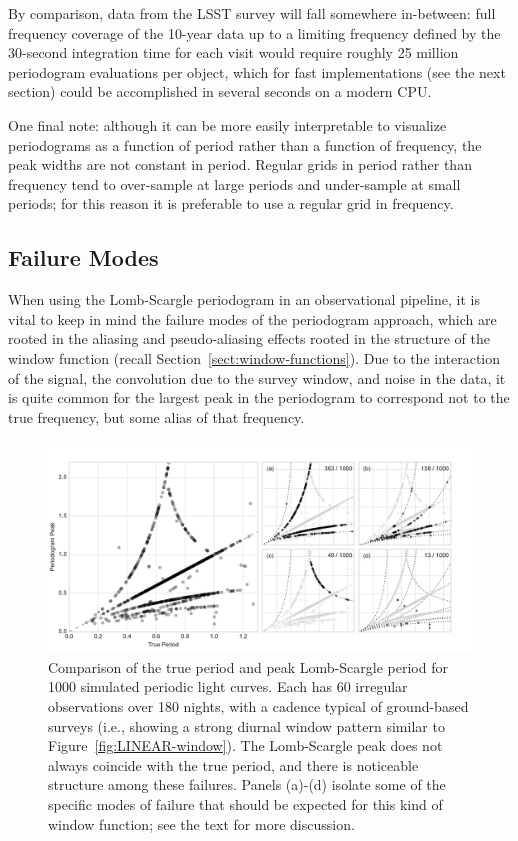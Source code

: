 \documentclass[preprint]{aastex}
\newcommand{\fig}[1]{Figure~\ref{fig:#1}}
\newcommand{\figlabel}[1]{\label{fig:#1}}
\newcommand{\Sect}[1]{Section~\ref{sect:#1}}
\newcommand{\sect}[1]{\Sect{#1}}
\newcommand{\sectlabel}[1]{\label{sect:#1}}
\begin{document}
By comparison, data from the LSST survey \citep{Ivezic08LSST}
will fall somewhere in-between: full frequency coverage of
the 10-year data up to a limiting frequency defined by the 30-second
integration time for each visit would require roughly 25 million
periodogram evaluations per object, which for fast implementations
(see the next section) could be accomplished in several seconds on
a modern CPU.

One final note: although it can be more easily interpretable to
visualize periodograms as a function of period rather than a function of
frequency, the peak widths are not constant in period.
Regular grids in period rather than frequency tend to over-sample
at large periods and under-sample at small periods;
for this reason it is preferable to use a regular grid in frequency.

\subsection{Failure Modes}
\sectlabel{failure-modes}

When using the Lomb-Scargle periodogram in an observational pipeline, it is
vital to keep in mind the failure modes of the periodogram approach, which
are rooted in the aliasing and pseudo-aliasing effects rooted in the structure
of the window function (recall \sect{window-functions}).
Due to the interaction of the signal, the convolution due to the survey window,
and noise in the data, it is quite common for the largest peak in the
periodogram to correspond not to the true frequency, but some alias of that
frequency.

\begin{figure}[ht]
  \centering
  \includegraphics[width=\textwidth]{fig25_failure_modes}
  \caption{Comparison of the true period and peak Lomb-Scargle period for
    1000 simulated periodic light curves.
    Each has 60 irregular observations over 180 nights,
    with a cadence typical of ground-based surveys (i.e., showing a strong
    diurnal window pattern similar to \fig{LINEAR-window}).
    The Lomb-Scargle peak does not always coincide with the true period,
    and there is noticeable structure among these failures.
    Panels (a)-(d) isolate some of the specific modes of failure that should
    be expected for this kind of window function;
    see the text for more discussion.
    \figlabel{failure-modes}}
\end{figure}
\end{document}
